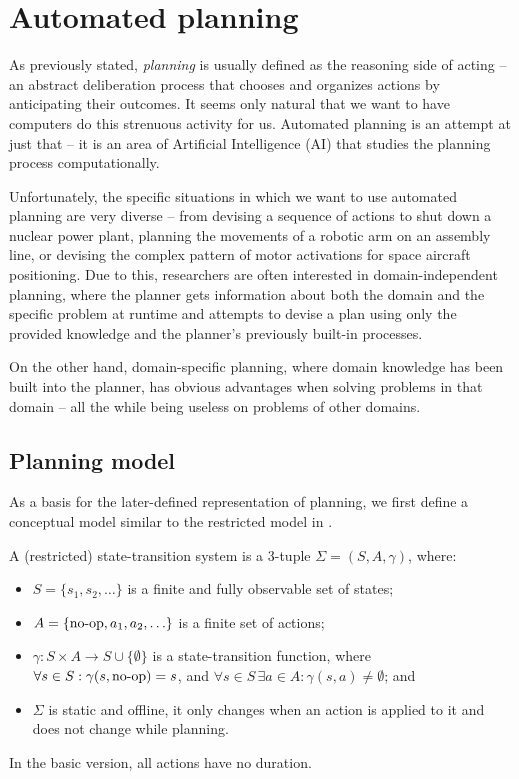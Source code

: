 
\section{Automated planning}

As previously stated, \textit{planning} is usually defined as the reasoning side of acting -- an abstract deliberation
process that chooses and organizes actions by anticipating their outcomes. \citep[Section~1.1]{Ghallab2004}
It seems only natural that we want to have computers do this strenuous activity for us.
Automated planning is an attempt at just that -- it is an area of Artificial Intelligence (AI) that
studies the planning process computationally. \citep[Section~1.1]{Ghallab2004}

Unfortunately, the specific situations in which we want to use automated planning are very diverse --
from devising a sequence of actions to shut down a nuclear power plant,
planning the movements of a robotic arm
on an assembly line, or devising the complex pattern of motor activations
for space aircraft positioning.
Due to this, researchers are often interested in domain-independent planning,
where the planner gets information
about both the domain and the specific problem at runtime and attempts to devise a plan using only the provided knowledge
and the planner's previously built-in processes. \citep[Section~1.3]{Ghallab2004}

On the other hand, domain-specific planning, where domain knowledge has been built into the planner,
has obvious advantages when solving problems in that domain -- all the while being useless on problems of other
domains. \citep[Section~1.3]{Ghallab2004}

\subsection{Planning model}

As a basis for the later-defined representation of planning, we first define
a conceptual model similar to the restricted model in \citep[Section~1.4, Section~1.5]{Ghallab2004}.

\begin{defn}\label{defn:state-transition-sys}
A (restricted) state-transition system is a 3-tuple $\Sigma = (S, A, \gamma)$, where:
\begin{itemize}
\item $S = \{s_1, s_2, \ldots\}$ is a finite and fully observable set of states;
\item $A = \{\operatorname{\textrm{no-op}}, a_1, a_2, \ldots\}$ is a finite set of actions;
\item $\gamma: S \times A \to S \cup \{\emptyset\}$ is a state-transition function,
where $\forall s \in S : \gamma(s, \operatorname{\textrm{no-op}}) = s$,
and $\forall s \in S\,\exists a \in A : \gamma(s, a) \neq \emptyset$; and
\item $\Sigma$ is static and offline,
it only changes when an action is applied to it and does not change while planning.
\end{itemize}
In the basic version, all actions have no duration.
\end{defn}


